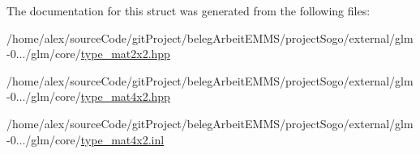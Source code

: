 The documentation for this struct was generated from the following files\-:\begin{DoxyCompactItemize}
\item 
/home/alex/source\-Code/git\-Project/beleg\-Arbeit\-E\-M\-M\-S/project\-Sogo/external/glm-\/0.../glm/core/\hyperlink{type__mat2x2_8hpp}{type\-\_\-mat2x2.\-hpp}\item 
/home/alex/source\-Code/git\-Project/beleg\-Arbeit\-E\-M\-M\-S/project\-Sogo/external/glm-\/0.../glm/core/\hyperlink{type__mat4x2_8hpp}{type\-\_\-mat4x2.\-hpp}\item 
/home/alex/source\-Code/git\-Project/beleg\-Arbeit\-E\-M\-M\-S/project\-Sogo/external/glm-\/0.../glm/core/\hyperlink{type__mat4x2_8inl}{type\-\_\-mat4x2.\-inl}\end{DoxyCompactItemize}
